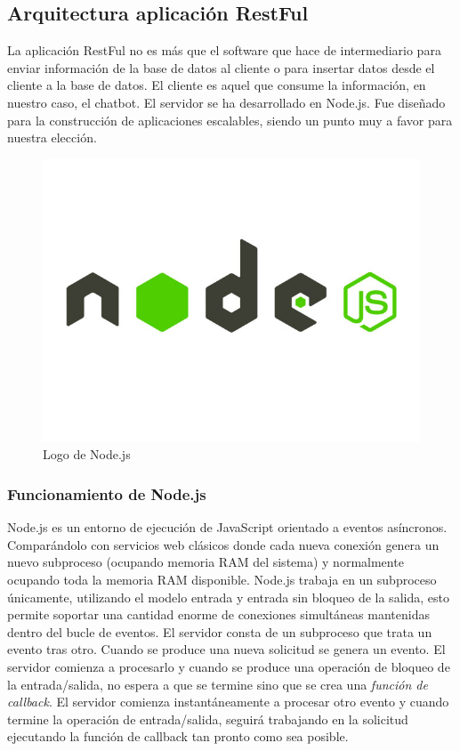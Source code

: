 \subsection{Arquitectura aplicación RestFul}

La aplicación RestFul no es más que el software que hace de intermediario para enviar información de la base de datos al cliente o para insertar datos desde el cliente a la base de datos. El cliente es aquel que consume la información, en nuestro caso, el chatbot. El servidor se ha desarrollado en Node.js. Fue diseñado para la construcción de aplicaciones escalables, siendo un punto muy a favor para nuestra elección. 

\begin{figure}[h]
    \centering
    \includegraphics[scale=0.15]{include/figuras/node.jpg}
    \caption{Logo de Node.js}
    \label{fig:node}
\end{figure}

\subsubsection{Funcionamiento de Node.js}

Node.js es un entorno de ejecución de JavaScript \cite{javascript} orientado a eventos asíncronos. Comparándolo con servicios web clásicos donde cada nueva conexión genera un nuevo subproceso (ocupando memoria RAM del sistema) y normalmente ocupando toda la memoria RAM disponible. Node.js trabaja en un subproceso únicamente, utilizando el modelo entrada y entrada sin bloqueo de la salida, esto permite soportar una cantidad enorme de conexiones simultáneas mantenidas dentro del bucle de eventos. El servidor consta de un subproceso que trata un evento tras otro.
Cuando se produce una nueva solicitud se genera un evento. El servidor comienza a procesarlo y cuando se produce una operación de bloqueo de la entrada/salida, no espera a que se termine sino que se crea una \textit{función de callback}. El servidor comienza instantáneamente a procesar otro evento y cuando termine la operación de entrada/salida, seguirá trabajando en la solicitud ejecutando la función de callback tan pronto como sea posible.

